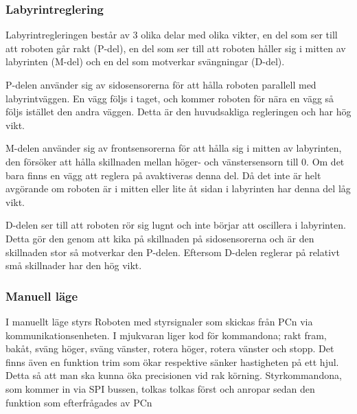 \subsubsection{Labyrintreglering}
\label{sec:labyrintreglering}
Labyrintregleringen består av 3 olika delar med olika vikter,
en del som ser till att roboten går rakt (P-del), en del som ser till att
roboten håller sig i mitten av labyrinten (M-del) och en del som motverkar
svängningar (D-del).


P-delen använder sig av sidosensorerna för att hålla roboten parallell med
labyrintväggen. En vägg följs i taget, och kommer roboten för nära en vägg så
följs istället den andra väggen. Detta är den huvudsakliga regleringen och har
hög vikt.


M-delen använder sig av frontsensorerna för att hålla sig i mitten av
labyrinten, den försöker att hålla skillnaden mellan höger- och vänstersensorn
till 0. Om det bara finns en vägg att reglera på avaktiveras denna del. Då det
inte är helt avgörande om roboten är i mitten eller lite åt sidan i labyrinten
har denna del låg vikt.


D-delen ser till att roboten rör sig lugnt och inte börjar att oscillera i
labyrinten. Detta gör den genom att kika på skillnaden på sidosensorerna och är
den skillnaden stor så motverkar den P-delen. Eftersom D-delen reglerar på
relativt små skillnader har den hög vikt.

\label{reglering}

\subsubsection{Manuell läge}

I manuellt läge styrs Roboten med styrsignaler som skickas från PCn via 
kommunikationsenheten. I mjukvaran liger kod för kommandona; rakt 
fram, bakåt, sväng höger, sväng vänster, rotera höger, rotera vänster
och stopp. Det finns även en funktion trim som ökar respektive sänker 
hastigheten på ett hjul. Detta så att man ska kunna öka precisionen vid 
rak körning. Styrkommandona, som kommer in via SPI bussen, tolkas 
tolkas först och anropar sedan den funktion som efterfrågades av PCn



	

